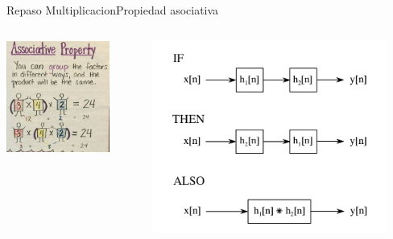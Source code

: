 \begin{frame}{Repaso Multiplicacion}{Propiedad asociativa}
   \begin{columns}[c]
      \hspace{5pt}
      \begin{column}{0.5\textwidth}
         \centering\includegraphics[width=0.8\textwidth]{5_clase/multi_asociativa}
      \end{column}
      \hspace{2pt}
      \vrule
      \hspace{2pt}
      \begin{column}{0.5\textwidth}
         \centering\includegraphics[width=0.9\textwidth]{5_clase/conv_asociativa}
      \end{column}
      \hspace{2pt}
   \end{columns}
   \vfill
\end{frame}
